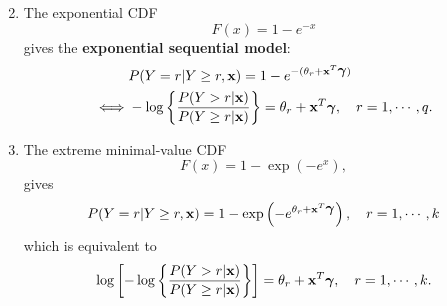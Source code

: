 \documentclass{beamer}
\begin{document}
\begin{frame}
\begin{enumerate}
\setcounter{enumi}{1}
\item
The  exponential CDF \[F(x)=1-e^{-x}\] gives the \textbf{exponential sequential model}:
\begin{eqnarray*}
& P(Y=r|Y\geq r,\textbf{x})=1-e^{-(\theta_r+\textbf{x}^T\mbox{\boldmath $\gamma$})} \\
\iff & -\log\left\{\frac{P(Y>r|\textbf{x})}{P(Y\geq r|\textbf{x})}\right\}=
\theta_r+\textbf{x}^T\mbox{\boldmath $\gamma$}, \quad r=1,\cdots,q.
\end{eqnarray*}
\item
The extreme minimal-value CDF 
\[
F(x)= 1-\exp(-e^x),
\] gives
\begin{equation}
P(Y=r|Y\geq r, \textbf{x})=1-\exp\left(-e^{\theta_r+\textbf{x}^T\mbox{\boldmath $\gamma$}}\right), 
\quad r=1,\cdots, k
\label{eq-3.3.18}
\end{equation}
which is equivalent to
\begin{equation}
\log\left[-\log\left\{\frac{P(Y>r|\textbf{x})}{P(Y\geq r|\textbf{x})}\right\}\right]=
\theta_r+\textbf{x}^T\mbox{\boldmath $\gamma$}, \quad r=1,\cdots, k.
\label{eq-3.3.19}
\end{equation}

\end{enumerate}
\end{frame}
\end{document}
